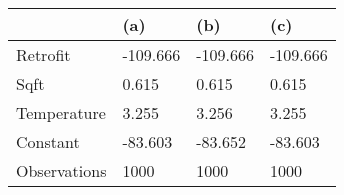\begin{tabular}{llll}
\toprule
 & (a) & (b) & (c) \\
\midrule
Retrofit & -109.666 & -109.666 & -109.666 \\
Sqft & 0.615 & 0.615 & 0.615 \\
Temperature & 3.255 & 3.256 & 3.255 \\
Constant & -83.603 & -83.652 & -83.603 \\
Observations & 1000 & 1000 & 1000 \\
\bottomrule
\end{tabular}
